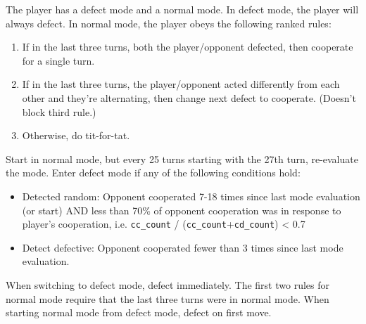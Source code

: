 \documentclass{article}
\begin{document}
The player has a defect mode and a normal mode.  In defect mode, the
player will always defect.  In normal mode, the player obeys the following
ranked rules:

    \begin{enumerate}
        \item If in the last three turns, both the player/opponent defected, then
            cooperate for a single turn.
        \item If in the last three turns, the player/opponent acted differently from
            each other and they're alternating, then change next defect to
            cooperate.  (Doesn't block third rule.)
        \item Otherwise, do tit-for-tat.
    \end{enumerate}

Start in normal mode, but every 25 turns starting with the 27th turn,
re-evaluate the mode.  Enter defect mode if any of the following
conditions hold:

    \begin{itemize}
        \item Detected random:  Opponent cooperated 7-18 times since last mode
evaluation (or start) AND less than 70\% of opponent cooperation was in
response to player's cooperation, i.e.
    \texttt{cc\_count} / (\texttt{cc\_count}+\texttt{cd\_count}) < 0.7
\item Detect defective:  Opponent cooperated fewer than 3 times since last mode
evaluation.
    \end{itemize}

When switching to defect mode, defect immediately. The first two rules for
normal mode require that the last three turns were in normal mode.  When starting
normal mode from defect mode, defect on first move.
\end{document}
